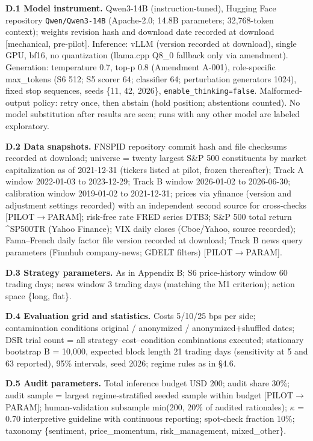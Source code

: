 \documentclass[
  12pt,
]{article}
\begin{document}
\textbf{D.1 Model instrument.} Qwen3-14B (instruction-tuned), Hugging
Face repository \texttt{Qwen/Qwen3-14B} (Apache-2.0; 14.8B parameters;
32,768-token context); weights revision hash and download date recorded
at download {[}mechanical, pre-pilot{]}. Inference: vLLM (version
recorded at download), single GPU, bf16, no quantization (llama.cpp
Q8\_0 fallback only via amendment). Generation: temperature 0.7, top-p
0.8 (Amendment A-001), role-specific max\_tokens (S6 512; S5 scorer 64;
classifier 64; perturbation generators 1024), fixed stop sequences,
seeds \{11, 42, 2026\}, \texttt{enable\_thinking=false}.
Malformed-output policy: retry once, then abstain (hold position;
abstentions counted). No model substitution after results are seen; runs
with any other model are labeled exploratory.

\textbf{D.2 Data snapshots.} FNSPID repository commit hash and file
checksums recorded at download; universe = twenty largest S\&P 500
constituents by market capitalization as of 2021-12-31 (tickers listed
at pilot, frozen thereafter); Track A window 2022-01-03 to 2023-12-29;
Track B window 2026-01-02 to 2026-06-30; calibration window 2019-01-02
to 2021-12-31; prices via yfinance (version and adjustment settings
recorded) with an independent second source for cross-checks
{[}PILOT\(\rightarrow\)PARAM{]}; risk-free rate FRED series DTB3; S\&P
500 total return \^{}SP500TR (Yahoo Finance); VIX daily closes
(Cboe/Yahoo, source recorded); Fama--French daily factor file version
recorded at download; Track B news query parameters (Finnhub
company-news; GDELT filters) {[}PILOT\(\rightarrow\)PARAM{]}.

\textbf{D.3 Strategy parameters.} As in Appendix B; S6 price-history
window 60 trading days; news window 3 trading days (matching the M1
criterion); action space \{long, flat\}.

\textbf{D.4 Evaluation grid and statistics.} Costs 5/10/25 bps per side;
contamination conditions original / anonymized / anonymized+shuffled
dates; DSR trial count = all strategy--cost--condition combinations
executed; stationary bootstrap B = 10,000, expected block length 21
trading days (sensitivity at 5 and 63 reported), 95\% intervals, seed
2026; regime rules as in §4.6.

\textbf{D.5 Audit parameters.} Total inference budget USD 200; audit
share 30\%; audit sample = largest regime-stratified seeded sample
within budget {[}PILOT\(\rightarrow\)PARAM{]}; human-validation
subsample min(200, 20\% of audited rationales); \(\kappa\) = 0.70
interpretive guideline with continuous reporting; spot-check fraction
10\%; taxonomy \{sentiment, price\_momentum, risk\_management,
mixed\_other\}.
\end{document}
